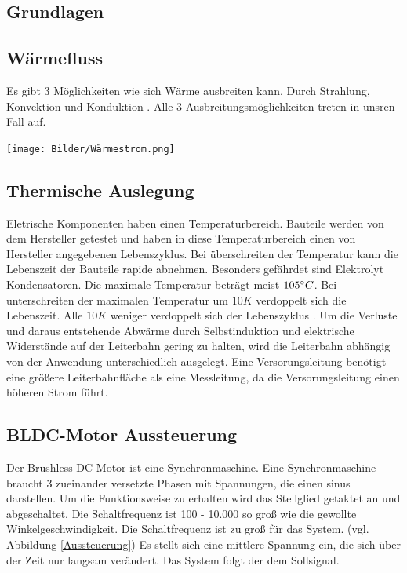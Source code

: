 \documentclass[10pt,a4paper,oneside,abstracton]{scrartcl}
\newenvironment{Figure}
  {\par\medskip\noindent\minipage{\linewidth}}
  {\endminipage\par\medskip}
\begin{document}
\begin{multicols}{2}
\section{Grundlagen}

\subsection{Wärmefluss}
Es gibt 3 Möglichkeiten 
wie sich Wärme ausbreiten kann. Durch Strahlung, Konvektion und Konduktion \cite{Waermefluss}. 
Alle 3 Ausbreitungsmöglichkeiten treten in unsren Fall auf. 


\begin{Figure}
	\texttt{[image: Bilder/Wärmestrom.png]}
	\label{l_Waermefluss}
\end{Figure}


\subsection{Thermische Auslegung}
Eletrische Komponenten haben einen Temperaturbereich. 
Bauteile werden von dem Hersteller getestet und haben in diese Temperaturbereich einen von Hersteller angegebenen Lebenszyklus. 
Bei überschreiten der Temperatur kann die Lebenszeit der Bauteile rapide abnehmen. 
Besonders gefährdet sind Elektrolyt Kondensatoren. 
Die maximale Temperatur beträgt meist $ 105 \degree C $. \newline
Bei unterschreiten der maximalen Temperatur um $ 10K $ verdoppelt sich die Lebenszeit. 
Alle $ 10K $ weniger verdoppelt sich der Lebenszyklus \cite{Elko}. 
\newline
Um die Verluste und daraus entstehende Abwärme durch Selbstinduktion und elektrische Widerstände  auf der Leiterbahn gering zu halten,
wird die Leiterbahn abhängig von der Anwendung unterschiedlich ausgelegt.
\newline
Eine Versorungsleitung benötigt eine größere Leiterbahnfläche als eine Messleitung, da die Versorungsleitung einen höheren Strom führt. 

\subsection{BLDC-Motor Aussteuerung}
Der Brushless DC Motor ist eine Synchronmaschine. 
Eine Synchronmaschine braucht 3 zueinander versetzte Phasen mit Spannungen, die einen sinus darstellen.
Um die Funktionsweise zu erhalten wird das Stellglied getaktet an und abgeschaltet. 
Die Schaltfrequenz ist 100 - 10.000 so groß wie die gewollte Winkelgeschwindigkeit. 
Die Schaltfrequenz ist zu groß für das System. (vgl. Abbildung \ref*{Aussteuerung})
\newline
Es stellt sich eine mittlere Spannung ein, die sich über der Zeit nur langsam verändert.
Das System folgt der dem Sollsignal.


\end{multicols}
\end{document}

